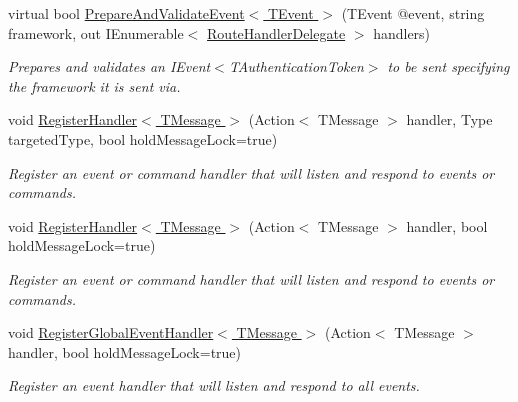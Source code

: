 \begin{DoxyCompactItemize}
virtual bool \hyperlink{classCqrs_1_1Akka_1_1Events_1_1AkkaEventBus_a1a89590afc6970f00fe055961a6773e8_a1a89590afc6970f00fe055961a6773e8}{Prepare\+And\+Validate\+Event$<$ T\+Event $>$} (T\+Event @event, string framework, out I\+Enumerable$<$ \hyperlink{classCqrs_1_1Bus_1_1RouteHandlerDelegate}{Route\+Handler\+Delegate} $>$ handlers)
\begin{DoxyCompactList}\small\item\em Prepares and validates an I\+Event$<$\+T\+Authentication\+Token$>$ to be sent specifying the framework it is sent via. \end{DoxyCompactList}\item 
void \hyperlink{classCqrs_1_1Akka_1_1Events_1_1AkkaEventBus_a59ec3e497e511b73b5239eee80691443_a59ec3e497e511b73b5239eee80691443}{Register\+Handler$<$ T\+Message $>$} (Action$<$ T\+Message $>$ handler, Type targeted\+Type, bool hold\+Message\+Lock=true)
\begin{DoxyCompactList}\small\item\em Register an event or command handler that will listen and respond to events or commands. \end{DoxyCompactList}\item 
void \hyperlink{classCqrs_1_1Akka_1_1Events_1_1AkkaEventBus_a6795dfcaf611ce1b50310f442cef0546_a6795dfcaf611ce1b50310f442cef0546}{Register\+Handler$<$ T\+Message $>$} (Action$<$ T\+Message $>$ handler, bool hold\+Message\+Lock=true)
\begin{DoxyCompactList}\small\item\em Register an event or command handler that will listen and respond to events or commands. \end{DoxyCompactList}\item 
void \hyperlink{classCqrs_1_1Akka_1_1Events_1_1AkkaEventBus_ab0df68070fbc625cad5cd2e74667b01d_ab0df68070fbc625cad5cd2e74667b01d}{Register\+Global\+Event\+Handler$<$ T\+Message $>$} (Action$<$ T\+Message $>$ handler, bool hold\+Message\+Lock=true)
\begin{DoxyCompactList}\small\item\em Register an event handler that will listen and respond to all events. \end{DoxyCompactList}\end{DoxyCompactItemize}
